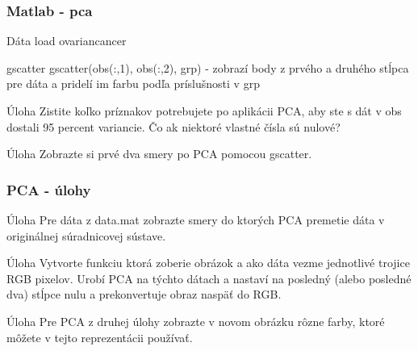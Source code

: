 \documentclass{beamer}
\begin{document}
\begin{frame}
\frametitle{Matlab - pca}

\begin{block}{Dáta}
load ovariancancer
\end{block}

\begin{block}{gscatter}
gscatter(obs(:,1), obs(:,2), grp) - zobrazí body z prvého a druhého stĺpca pre dáta a pridelí im farbu podľa príslušnosti v grp
\end{block}

\begin{block}{Úloha}
Zistite koľko príznakov potrebujete po aplikácii PCA, aby ste s dát v obs dostali 95 percent variancie. Čo ak niektoré vlastné čísla sú nulové?
\end{block}

\begin{block}{Úloha}
Zobrazte si prvé dva smery po PCA pomocou gscatter.
\end{block}
\end{frame}


\begin{frame}
\frametitle{PCA - úlohy}

\begin{block}{Úloha}
Pre dáta z data.mat zobrazte smery do ktorých PCA premetie dáta v originálnej súradnicovej sústave.
\end{block}

\begin{block}{Úloha}
Vytvorte funkciu ktorá zoberie obrázok a ako dáta vezme jednotlivé trojice RGB pixelov. Urobí PCA na týchto dátach a nastaví na posledný (alebo posledné dva) stĺpce nulu a prekonvertuje obraz naspäť do RGB.
\end{block}

\begin{block}{Úloha}
Pre PCA z druhej úlohy zobrazte v novom obrázku rôzne farby, ktoré môžete v tejto reprezentácii používať.
\end{block}
\end{frame}
\end{document}
